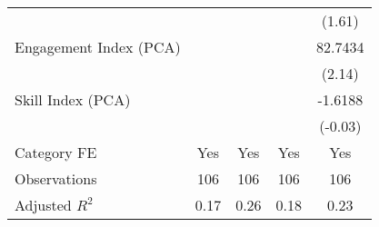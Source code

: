 {\begin{tabular}{l*{4}{c}}
                                   &                   &                   &                   &    (1.61)         \\
[1em]
Engagement Index (PCA)             &                   &                   &                   &   82.7434\sym{**} \\
                                   &                   &                   &                   &    (2.14)         \\
[1em]
Skill Index (PCA)                  &                   &                   &                   &   -1.6188         \\
                                   &                   &                   &                   &   (-0.03)         \\
[1em]
Category FE                        &       Yes         &       Yes         &       Yes         &       Yes         \\
\hline
Observations                       &       106         &       106         &       106         &       106         \\
Adjusted \(R^{2}\)                 &      0.17         &      0.26         &      0.18         &      0.23         \\
\hline\hline
\end{tabular}
}
